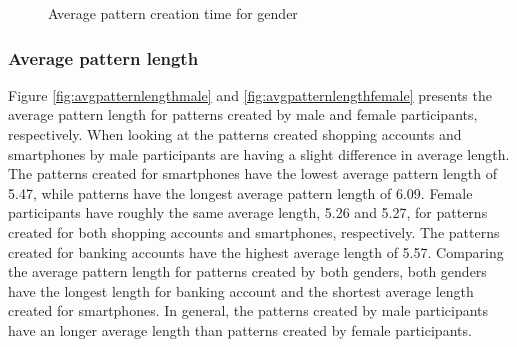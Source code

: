    \begin{figure}[H]
      \centering
      \caption{Average pattern creation time for gender}
      \label{fig:avgcreationtimegender}
    \end{figure}

    \clearpage
    \subsubsection{Average pattern length}
    Figure \ref{fig:avgpatternlengthmale} and \ref{fig:avgpatternlengthfemale} presents the average pattern length for patterns created by male and female participants, respectively. When looking at the patterns created shopping accounts and smartphones by male participants are having a slight difference in average length. The patterns created for smartphones have the lowest average pattern length of 5.47, while patterns have the longest average pattern length of 6.09. Female participants have roughly the same average length, 5.26 and 5.27, for patterns created for both shopping accounts and smartphones, respectively. The patterns created for banking accounts have the highest average length of 5.57. Comparing the average pattern length for patterns created by both genders, both genders have the longest length for banking account and the shortest average length created for smartphones. In general, the patterns created by male participants have an longer average length than patterns created by female participants. 

